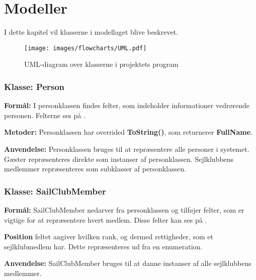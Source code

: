 \chapter{Modeller} \label{chap:klasser}

I dette kapitel vil klasserne i modellaget blive beskrevet.

\begin{figure}[H]
  \centering
  \texttt{[image: images/flowcharts/UML.pdf]}
  \caption{UML-diagram over klasserne i projektets program}
  \label{img:UML}
\end{figure}

\subsection*{Klasse: Person} 
\textbf{Formål:}
I personklassen findes felter, som indeholder informationer vedrørende personen. Felterne ses på .

\textbf{Metoder:}
Personklassen har overrided \textbf{ToString()}, som returnerer \textbf{FullName}.

\textbf{Anvendelse:}
Personklassen bruges til at repræsentere alle personer i systemet. 
Gæster repræsenteres direkte som instanser af personklassen. 
Sejlklubbens medlemmer repræsenteres som subklasser af personklassen. 

\subsection*{Klasse: SailClubMember}

\textbf{Formål:}
SailClubMember nedarver fra personklassen og tilføjer felter, som er vigtige for at repræsentere hvert medlem.
Disse felter kan ses på .

\textbf{Position} feltet angiver hvilken rank, og dermed rettigheder, som et sejlklubmedlem har. 
Dette repræsenteres ud fra en enumeration.

\textbf{Anvendelse:}
SailClubMember bruges til at danne instanser af alle sejlklubbens medlemmer. 

